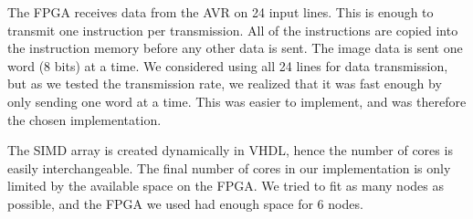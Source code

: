 The \ac{FPGA} receives data from the AVR on 24 input lines. This is enough to
transmit one instruction per transmission. All of the instructions are copied
into the instruction memory before any other data is sent. The image data is
sent one word (8 bits) at a time. We considered using all 24 lines for data
transmission, but as we tested the transmission rate, we realized that it was
fast enough by only sending one word at a time. This was easier to
implement, and was therefore the chosen implementation.

The \ac{SIMD} array is created dynamically in \ac{VHDL}, hence the number of
cores is easily interchangeable. The final number of cores in our implementation
is only limited by the available space on the \ac{FPGA}. We tried to fit as many
nodes as possible, and the \ac{FPGA} we used had enough space for 6 nodes.

